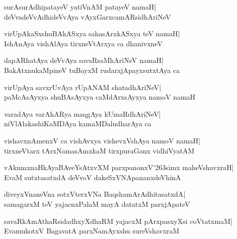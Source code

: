 \documentclass[twoside,12pt,openright]{book}
\def\S{\char'263}
\newcounter{shloka}[chapter]
\begin{document}
\begin{shloka}%
surAsurAdhipatayeV yatiVnAM patayeV namaH|\\
deVvadeVvAdhideVvAya vAyxGarxcamARsidhAriNeV
\end{shloka}

\begin{shloka}%
virUpAkaSxshuBAkASxya sahasArxkASxya teV namaH|\\
IshAnAya vishAlAya tirxneVtArxya ca dhanivxneV
\end{shloka}

\begin{shloka}%
dapARhatAya deVvAya savaRsaMhAriNeV namaH|\\
BakAtxnukaMpineV tuBayxM rudarxjApayxsutxtAya ca
\end{shloka}

\begin{shloka}%
virUpAya savxrUvAya rUpANAM shatadhAriNeV|\\
paMcAsAyxya shuBAsAyxya caMdArxsAyxya namoV namaH
\end{shloka}

\begin{shloka}%
varadAya varAhARya maqgAya kUmaRdhAriNeV|\\
niVlAlakashiKaMDAya kamaMDaludharAya ca
\end{shloka}

\begin{shloka}%
vishavxnAmenxV ca vishAvxya vishevxVshAya namoV namaH|\\
tirxneVtarx tArxNamasAmxkaM tirxpuraGanx vidhiVyatAM
\end{shloka}

\begin{shloka}%
vAknmxnaHkAyaBAveYsAtxvXM parxpanonxV\S simx maheVshavxraH|\\
EvaM sutxtasatxdA deVvoV dakeSxVNApananxdeVhinA
\end{shloka}

\begin{shloka}%
diveyxVnaneVna sotxVterxVNa BaqshamArAdhitasatxdA|\\
samagarxM teV yajacnxPalaM mayA datatxM parxjApateV
\end{shloka}

\begin{shloka}%
savaRkAmAthaRsidadhxyXdhaRM yajacxM pArxpasxyXsi coVtatxmaM|\\
EvamukotxV BagavatA parxNamAyxshu sureVshavxraM
\end{shloka}
\end{document}
